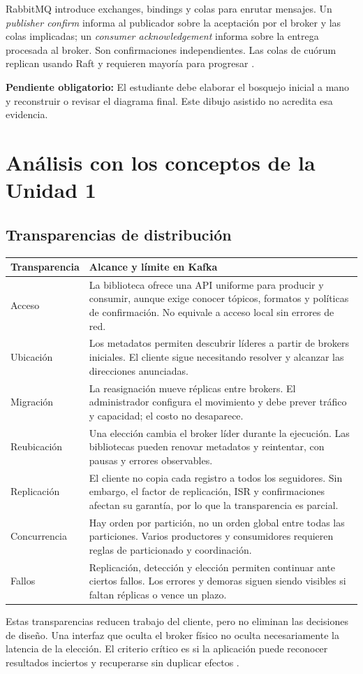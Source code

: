 \documentclass[11pt,a4paper]{article}
\newcommand{\pendiente}[1]{\par\textbf{Pendiente obligatorio:} #1\par}
\begin{document}
RabbitMQ introduce exchanges, bindings y colas para enrutar mensajes. Un \textit{publisher confirm} informa al publicador sobre la aceptación por el broker y las colas implicadas; un \textit{consumer acknowledgement} informa sobre la entrega procesada al broker. Son confirmaciones independientes. Las colas de cuórum replican usando Raft y requieren mayoría para progresar \cite{rabbitquorum,rabbitconfirms}.
\pendiente{El estudiante debe elaborar el bosquejo inicial a mano y reconstruir o revisar el diagrama final. Este dibujo asistido no acredita esa evidencia.}

\section{Análisis con los conceptos de la Unidad 1}
\subsection{Transparencias de distribución}
\begin{longtable}{P{.19\textwidth}P{.74\textwidth}}
\toprule Transparencia & Alcance y límite en Kafka\\\midrule\endhead
Acceso & La biblioteca ofrece una API uniforme para producir y consumir, aunque exige conocer tópicos, formatos y políticas de confirmación. No equivale a acceso local sin errores de red.\\
Ubicación & Los metadatos permiten descubrir líderes a partir de brokers iniciales. El cliente sigue necesitando resolver y alcanzar las direcciones anunciadas.\\
Migración & La reasignación mueve réplicas entre brokers. El administrador configura el movimiento y debe prever tráfico y capacidad; el costo no desaparece.\\
Reubicación & Una elección cambia el broker líder durante la ejecución. Las bibliotecas pueden renovar metadatos y reintentar, con pausas y errores observables.\\
Replicación & El cliente no copia cada registro a todos los seguidores. Sin embargo, el factor de replicación, ISR y confirmaciones afectan su garantía, por lo que la transparencia es parcial.\\
Concurrencia & Hay orden por partición, no un orden global entre todas las particiones. Varios productores y consumidores requieren reglas de particionado y coordinación.\\
Fallos & Replicación, detección y elección permiten continuar ante ciertos fallos. Los errores y demoras siguen siendo visibles si faltan réplicas o vence un plazo.\\\bottomrule
\end{longtable}
Estas transparencias reducen trabajo del cliente, pero no eliminan las decisiones de diseño. Una interfaz que oculta el broker físico no oculta necesariamente la latencia de la elección. El criterio crítico es si la aplicación puede reconocer resultados inciertos y recuperarse sin duplicar efectos \cite{kafka391design}.
\end{document}
